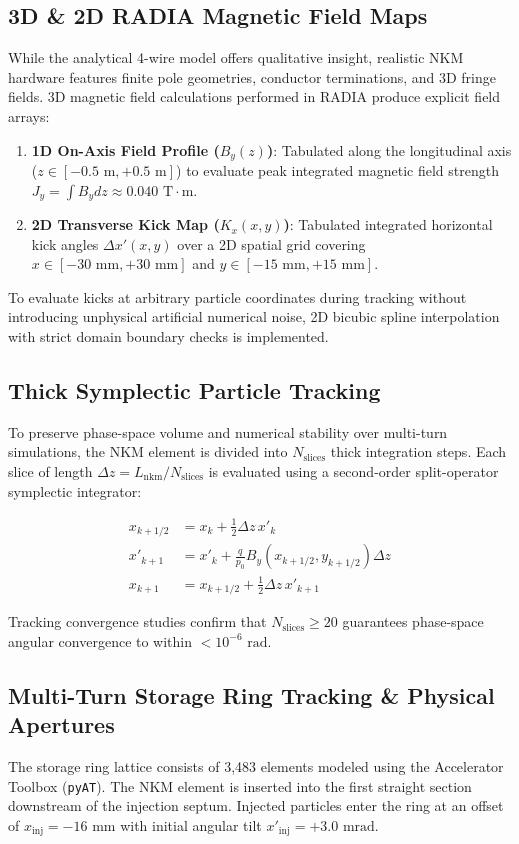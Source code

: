 \documentclass[11pt,a4paper]{article}
\begin{document}
\subsection{3D \& 2D RADIA Magnetic Field Maps}
While the analytical 4-wire model offers qualitative insight, realistic NKM hardware features finite pole geometries, conductor terminations, and 3D fringe fields. 3D magnetic field calculations performed in RADIA produce explicit field arrays:
\begin{enumerate}
    \item \textbf{1D On-Axis Field Profile ($B_y(z)$)}: Tabulated along the longitudinal axis ($z \in [-0.5\text{ m}, +0.5\text{ m}]$) to evaluate peak integrated magnetic field strength $J_y = \int B_y dz \approx 0.040\text{ T}\cdot\text{m}$.
    \item \textbf{2D Transverse Kick Map ($K_x(x,y)$)}: Tabulated integrated horizontal kick angles $\Delta x'(x,y)$ over a 2D spatial grid covering $x \in [-30\text{ mm}, +30\text{ mm}]$ and $y \in [-15\text{ mm}, +15\text{ mm}]$.
\end{enumerate}

To evaluate kicks at arbitrary particle coordinates during tracking without introducing unphysical artificial numerical noise, 2D bicubic spline interpolation with strict domain boundary checks is implemented.

\subsection{Thick Symplectic Particle Tracking}
To preserve phase-space volume and numerical stability over multi-turn simulations, the NKM element is divided into $N_{\text{slices}}$ thick integration steps. Each slice of length $\Delta z = L_{\text{nkm}} / N_{\text{slices}}$ is evaluated using a second-order split-operator symplectic integrator:

\begin{align}
x_{k+1/2} &= x_k + \frac{1}{2} \Delta z \, x'_k \\
x'_{k+1}  &= x'_k + \frac{q}{p_0} B_y\left(x_{k+1/2}, y_{k+1/2}\right) \Delta z \\
x_{k+1}   &= x_{k+1/2} + \frac{1}{2} \Delta z \, x'_{k+1}
\end{align}

Tracking convergence studies confirm that $N_{\text{slices}} \ge 20$ guarantees phase-space angular convergence to within $< 10^{-6}\text{ rad}$.

\subsection{Multi-Turn Storage Ring Tracking \& Physical Apertures}
The storage ring lattice consists of 3,483 elements modeled using the Accelerator Toolbox (\texttt{pyAT}). The NKM element is inserted into the first straight section downstream of the injection septum. Injected particles enter the ring at an offset of $x_{\text{inj}} = -16\text{ mm}$ with initial angular tilt $x'_{\text{inj}} = +3.0\text{ mrad}$. 
\end{document}
